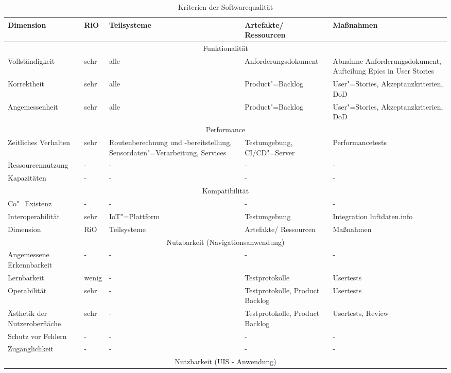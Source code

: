\begin{landscape}
 \begin{longtable}{|p{4.5cm}|p{1.5cm}|p{4.5cm}|p{4.5cm}|p{3.5cm}|}
 	\caption{Kriterien der Softwarequalität}\\%
   \hline
   Dimension & RiO & Teilsysteme & Artefakte/ Ressourcen & Maßnahmen\\ \hline
   \multicolumn{5}{|c|}{Funktionalität} \\ \hline
   Vollständigkeit & sehr & alle &  Anforderungsdokument & Abnahme Anforderungsdokument, Aufteilung Epics in User Stories\\
   \hline
   Korrektheit & sehr & alle &  Product"=Backlog & User"=Stories, Akzeptanzkriterien, DoD\\ \hline
   Angemessenheit & sehr & alle &  Product"=Backlog & User"=Stories, Akzeptanzkriterien, DoD\\ \hline
   \multicolumn{5}{|c|}{Performance}  \\ \hline
   Zeitliches Verhalten & sehr & Routenberechnung und -bereitstellung, Sensordaten"=Verarbeitung, Services &  Testumgebung, CI/CD"=Server & Performancetests\\ \hline
   Ressourcennutzung & - & - & - & - \\ \hline
   Kapazitäten & - & - & - & - \\ \hline   
   \multicolumn{5}{|c|}{Kompatibilität}  \\ \hline
   Co"=Existenz & - & - & - & - \\ \hline
   Interoperabilität & sehr & IoT"=Plattform & Testumgebung & Integration luftdaten.info \\ \hline
   Dimension & RiO & Teilsysteme & Artefakte/ Ressourcen & Maßnahmen\\ \hline
   \multicolumn{5}{|c|}{Nutzbarkeit (Navigationsanwendung)} \\ \hline
   Angemessene Erkennbarkeit & - & - & - & - \\ \hline
   Lernbarkeit & wenig & - & Testprotokolle & Usertests \\ \hline
   Operabilität & sehr & - & Testprotokolle, Product Backlog & Usertests \\ \hline
   Ästhetik der Nutzeroberfläche & sehr & - & Testprotokolle, Product Backlog & Usertests, Review \\ \hline
   Schutz vor Fehlern & - & - & - & - \\ \hline
   Zugänglichkeit & - & - & - & - \\ \hline  
   \multicolumn{5}{|c|}{Nutzbarkeit (UIS - Anwendung)} \\ \hline

\end{longtable}
\end{landscape}
